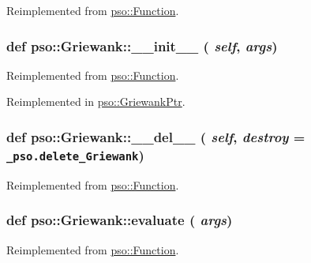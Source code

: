 Reimplemented from \hyperlink{classpso_1_1Function_959f07a6de4f333461fdb0261e6c25ae}{pso::Function}.\hypertarget{classpso_1_1Griewank_c84ac13db6c58cd5ca948ba0340ab4f8}{
\subsubsection{\setlength{\rightskip}{0pt plus 5cm}def pso::Griewank::\_\-\_\-init\_\-\_\- ( {\em self}, \/   {\em args})}}
\label{classpso_1_1Griewank_c84ac13db6c58cd5ca948ba0340ab4f8}




Reimplemented from \hyperlink{classpso_1_1Function_6874097c6476dc85af64b40e76a807e9}{pso::Function}.

Reimplemented in \hyperlink{classpso_1_1GriewankPtr_0814eb7cbb6badaa00a5eeb06077b7db}{pso::GriewankPtr}.\hypertarget{classpso_1_1Griewank_de940e1ba1459422e6e012a71a09f14b}{
\subsubsection{\setlength{\rightskip}{0pt plus 5cm}def pso::Griewank::\_\-\_\-del\_\-\_\- ( {\em self}, \/   {\em destroy} = {\tt \_\-pso.delete\_\-Griewank})}}
\label{classpso_1_1Griewank_de940e1ba1459422e6e012a71a09f14b}




Reimplemented from \hyperlink{classpso_1_1Function_c80bd40fcf4a956e5732ed099bccc598}{pso::Function}.\hypertarget{classpso_1_1Griewank_13250cfc11071d8fd3bf65a5eb69f397}{
\subsubsection{\setlength{\rightskip}{0pt plus 5cm}def pso::Griewank::evaluate ( {\em args})}}
\label{classpso_1_1Griewank_13250cfc11071d8fd3bf65a5eb69f397}




Reimplemented from \hyperlink{classpso_1_1Function_7c958ea6d942a89ae219b872b4d73541}{pso::Function}.

